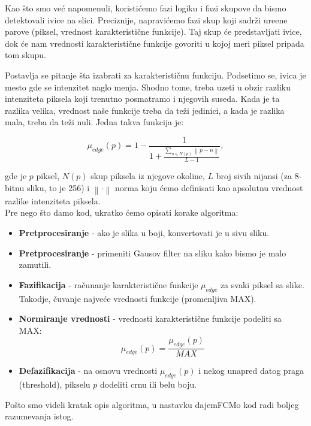 \documentclass[12pt,a4paper]{article}
\theoremstyle{definition}
\theoremstyle{remark}
\theoremstyle{plain}
\begin{document}
Kao \v sto smo ve\' c napomenuli, koristi\' cemo fazi logiku i fazi skupove da bismo detektovali ivice na slici. Preciznije, napravi\' cemo fazi skup koji sadr\v zi ure\dj ene parove (piksel, vrednost karakteristi\v cne funkcije). Taj skup \' ce predstavljati ivice, dok \' ce nam vrednosti karakteristi\v cne funkcije govoriti u kojoj meri piksel pripada tom skupu.

Postavlja se pitanje \v sta izabrati za karakteristi\v cnu funkciju. Podsetimo se, ivica je mesto gde se intenzitet naglo menja. Shodno tome, treba uzeti u obzir razliku intenziteta piksela koji trenutno posmatramo i njegovih suseda. Kada je ta razlika velika, vrednost na\v se funkcije treba da te\v zi jedinici, a kada je razlika mala, treba da te\v zi nuli. Jedna takva funkcija je:

\begin{equation}
  \mu_{edge}(p) = 1 - \frac{1}{1+\frac{\sum_{n\in N(p)}\left\|p-n\right\|}{L-1}},
\end{equation}

gde je $p$ piksel, $N(p)$ skup piksela iz njegove okoline, $L$ broj sivih nijansi (za 8-bitnu sliku, to je 256) i $\left\| \cdot \right\|$ norma koju \' cemo definisati kao apsolutnu vrednost razlike intenziteta piksela.\\

Pre nego \v sto damo kod, ukratko \' cemo opisati korake algoritma:
\begin{itemize}
  \item \textbf{Pretprocesiranje} - ako je slika u boji, konvertovati je u sivu sliku.
  \item \textbf{Pretprocesiranje} - primeniti Gausov filter na sliku kako bismo je malo zamutili.
  \item \textbf{Fazifikacija} - ra\v cunanje karakteristi\v cne funkcije $\mu_{edge}$ za svaki piksel sa slike. Takodje, \v cuvanje najve\' ce vrednosti funkcije (promenljiva MAX).
  \item \textbf{Normiranje vrednosti} - vrednosti karakteristi\v cne funkcije podeliti sa MAX:
    \begin{equation*}
      \mu_{edge}(p) = \frac{\mu_{edge}(p)}{MAX}
    \end{equation*}
  \item \textbf{Defazifikacija} - na osnovu vrednosti $\mu_{edge}(p)$ i nekog unapred datog praga (threshold), pikselu $p$ dodeliti crnu ili belu boju.
\end{itemize}

Po\v sto smo videli kratak opis algoritma, u nastavku dajemFCMo kod radi boljeg razumevanja istog.
\end{document}
